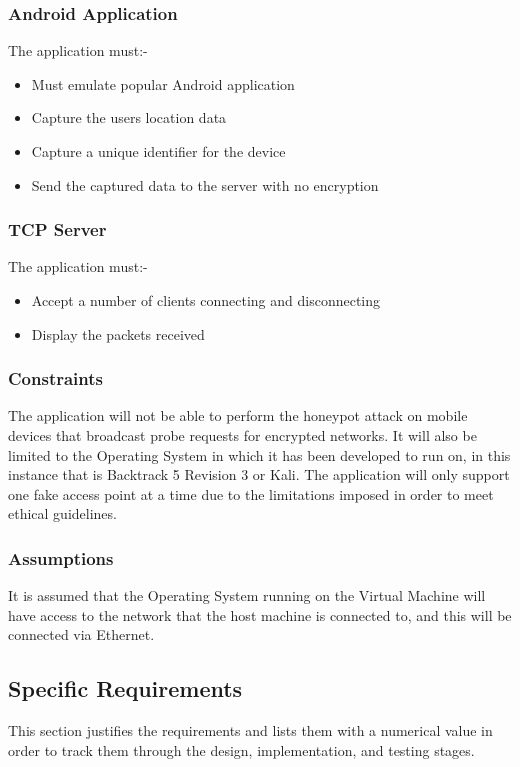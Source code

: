 \subsubsection*{Android Application}
The application must:-
\begin{itemize}
	\item Must emulate popular Android application
	\item Capture the users location data
	\item Capture a unique identifier for the device
	\item Send the captured data to the server with no encryption
\end{itemize}

\subsubsection*{TCP Server}
The application must:-
\begin{itemize}
	\item Accept a number of clients connecting and disconnecting
	\item Display the packets received
\end{itemize}

\subsubsection{Constraints}
The application will not be able to perform the honeypot attack on mobile devices that broadcast probe requests for encrypted networks. It will also be limited to the Operating System in which it has been developed to run on, in this instance that is Backtrack 5 Revision 3 or Kali. The application will only support one fake access point at a time due to the limitations imposed in order to meet ethical guidelines.

\subsubsection{Assumptions}
It is assumed that the Operating System running on the Virtual Machine will have access to the network that the host machine is connected to, and this will be connected via Ethernet.

\subsection{Specific Requirements}
This section justifies the requirements and lists them with a numerical value in order to track them through the design, implementation, and testing stages.

